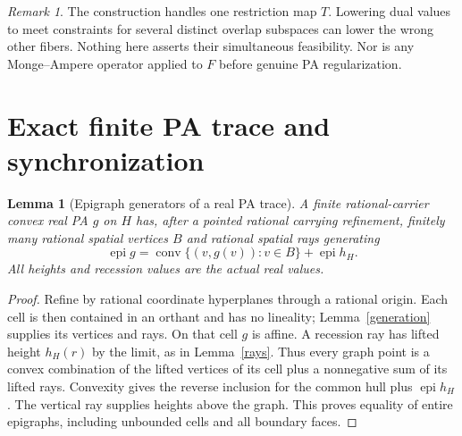 \documentclass[11pt]{article}
\newtheorem{lemma}[theorem]{Lemma}
\theoremstyle{definition}\newtheorem{definition}[theorem]{Definition}
\theoremstyle{remark}\newtheorem{remark}[theorem]{Remark}
\newcommand{\epi}{\operatorname{epi}}\newcommand{\conv}{\operatorname{conv}}
\begin{document}
\begin{remark}
The construction handles one restriction map $T$. Lowering dual values to meet constraints for several distinct overlap subspaces can lower the wrong other fibers. Nothing here asserts their simultaneous feasibility. Nor is any Monge--Ampere operator applied to $F$ before genuine PA regularization.
\end{remark}

\section{Exact finite PA trace and synchronization}
\begin{lemma}[Epigraph generators of a real PA trace]\label{tracegenerators}
A finite rational-carrier convex real PA $g$ on $H$ has, after a pointed rational carrying refinement, finitely many rational spatial vertices $B$ and rational spatial rays generating
\[
\epi g=\conv\{(v,g(v)):v\in B\}+\epi h_H.
\]
All heights and recession values are the actual real values.
\end{lemma}
\begin{proof}
Refine by rational coordinate hyperplanes through a rational origin. Each cell is then contained in an orthant and has no lineality; Lemma~\ref{generation} supplies its vertices and rays. On that cell $g$ is affine. A recession ray has lifted height $h_H(r)$ by the limit, as in Lemma~\ref{rays}. Thus every graph point is a convex combination of the lifted vertices of its cell plus a nonnegative sum of its lifted rays. Convexity gives the reverse inclusion for the common hull plus $\epi h_H$. The vertical ray supplies heights above the graph. This proves equality of entire epigraphs, including unbounded cells and all boundary faces.
\end{proof}
\end{document}
